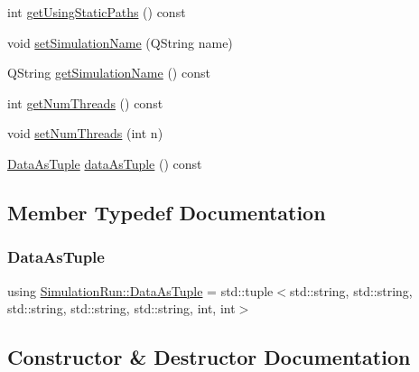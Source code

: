 \begin{DoxyCompactItemize}
\item 
int \mbox{\hyperlink{class_simulation_run_aff46892b74cc5c707f5ba8d086fd3495}{get\+Using\+Static\+Paths}} () const
\item 
void \mbox{\hyperlink{class_simulation_run_abffaf9f16b4d0e5319ee83c2b53517fb}{set\+Simulation\+Name}} (Q\+String name)
\item 
Q\+String \mbox{\hyperlink{class_simulation_run_a00f77dc90e47f763fc59c134ffe1afaa}{get\+Simulation\+Name}} () const
\item 
int \mbox{\hyperlink{class_simulation_run_ae0469ae8b80f42d56bf876baff89a3b8}{get\+Num\+Threads}} () const
\item 
void \mbox{\hyperlink{class_simulation_run_a3b2f0c24b0fca74202638d4f115c47c9}{set\+Num\+Threads}} (int n)
\item 
\mbox{\hyperlink{class_simulation_run_a0088973963e3846e2543a2b14c686d7b}{Data\+As\+Tuple}} \mbox{\hyperlink{class_simulation_run_a4deb60285fa85aafcd335ba73e6a2f79}{data\+As\+Tuple}} () const
\end{DoxyCompactItemize}


\subsection{Member Typedef Documentation}
\mbox{\label{class_simulation_run_a0088973963e3846e2543a2b14c686d7b}} 
\subsubsection{\texorpdfstring{DataAsTuple}{DataAsTuple}}
{\footnotesize\ttfamily using \mbox{\hyperlink{class_simulation_run_a0088973963e3846e2543a2b14c686d7b}{Simulation\+Run\+::\+Data\+As\+Tuple}} =  std\+::tuple$<$std\+::string, std\+::string, std\+::string, std\+::string, std\+::string, int, int$>$}



\subsection{Constructor \& Destructor Documentation}
\mbox{\label{class_simulation_run_a47b9805293df9abf6d64ce2919d86e1e}} 
